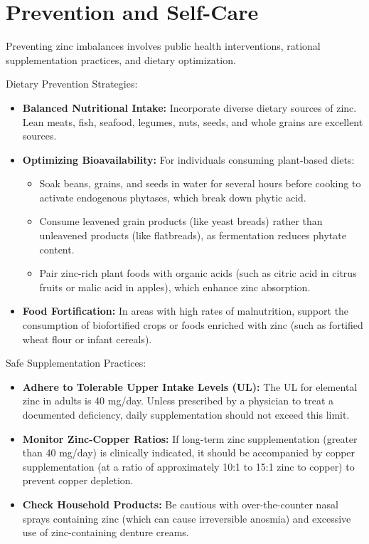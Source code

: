\section*{Prevention and Self-Care}
Preventing zinc imbalances involves public health interventions, rational supplementation practices, and dietary optimization.

Dietary Prevention Strategies:
\begin{itemize}
    \item \textbf{Balanced Nutritional Intake:} Incorporate diverse dietary sources of zinc. Lean meats, fish, seafood, legumes, nuts, seeds, and whole grains are excellent sources.
    \item \textbf{Optimizing Bioavailability:} For individuals consuming plant-based diets:
    \begin{itemize}
        \item Soak beans, grains, and seeds in water for several hours before cooking to activate endogenous phytases, which break down phytic acid.
        \item Consume leavened grain products (like yeast breads) rather than unleavened products (like flatbreads), as fermentation reduces phytate content.
        \item Pair zinc-rich plant foods with organic acids (such as citric acid in citrus fruits or malic acid in apples), which enhance zinc absorption.
    \end{itemize}
    \item \textbf{Food Fortification:} In areas with high rates of malnutrition, support the consumption of biofortified crops or foods enriched with zinc (such as fortified wheat flour or infant cereals).
\end{itemize}

Safe Supplementation Practices:
\begin{itemize}
    \item \textbf{Adhere to Tolerable Upper Intake Levels (UL):} The UL for elemental zinc in adults is 40 mg/day. Unless prescribed by a physician to treat a documented deficiency, daily supplementation should not exceed this limit.
    \item \textbf{Monitor Zinc-Copper Ratios:} If long-term zinc supplementation (greater than 40 mg/day) is clinically indicated, it should be accompanied by copper supplementation (at a ratio of approximately 10:1 to 15:1 zinc to copper) to prevent copper depletion.
    \item \textbf{Check Household Products:} Be cautious with over-the-counter nasal sprays containing zinc (which can cause irreversible anosmia) and excessive use of zinc-containing denture creams.
\end{itemize}

